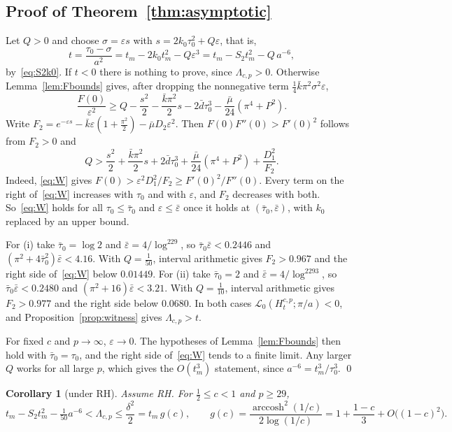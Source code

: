 \documentclass[11pt]{article}
\numberwithin{equation}{section}
\newtheorem{corollary}[theorem]{Corollary}
\theoremstyle{definition}
\theoremstyle{remark}
\DeclareMathOperator{\arccosh}{arccosh}
\newcommand{\Lag}{\mathscr L_0}
\begin{document}
\subsection{Proof of Theorem~\ref{thm:asymptotic}}
Let $Q>0$ and choose $\sigma=\varepsilon s$ with
$s=2k_0\tau_0^2+Q\varepsilon$, that is,
\[
t=\frac{\tau_0-\sigma}{a^2}=t_m-2k_0t_m^2-Q\varepsilon^3
=t_m-S_2t_m^2-Q\,a^{-6},
\]
by~\eqref{eq:S2k0}. If $t<0$ there is nothing to prove, since
$\Lambda_{c,p}>0$. Otherwise Lemma~\ref{lem:Fbounds} gives, after dropping
the nonnegative term $\tfrac14\bar k\pi^2\sigma^2\varepsilon$,
\[
\frac{F(0)}{\varepsilon^2}\ge Q-\frac{s^2}2-\frac{\bar k\pi^2}2s
-2\bar d\tau_0^3-\frac{\bar\mu}{24}(\pi^4+P^2) .
\]
Write $F_2=e^{-\varepsilon s}-\bar k\varepsilon(1+\tfrac{\pi^2}2)
-\bar\mu D_2\varepsilon^2$. Then $F(0)F''(0)>F'(0)^2$ follows from $F_2>0$
and
\begin{equation}\label{eq:W}
Q>\frac{s^2}2+\frac{\bar k\pi^2}2s+2\bar d\tau_0^3
+\frac{\bar\mu}{24}(\pi^4+P^2)+\frac{D_1^2}{F_2}.
\end{equation}
Indeed, \eqref{eq:W} gives $F(0)>\varepsilon^2D_1^2/F_2\ge F'(0)^2/F''(0)$.
Every term on the right of~\eqref{eq:W} increases with $\tau_0$ and with
$\varepsilon$, and $F_2$ decreases with both. So~\eqref{eq:W} holds for all
$\tau_0\le\bar\tau_0$ and $\varepsilon\le\bar\varepsilon$ once it holds at
$(\bar\tau_0,\bar\varepsilon)$, with $k_0$ replaced by an upper bound.

For (i) take $\bar\tau_0=\log2$ and $\bar\varepsilon=4/\log^229$, so
$\bar\tau_0\bar\varepsilon<0.2446$ and $(\pi^2+4\bar\tau_0^2)\bar\varepsilon
<4.16$. With $Q=\tfrac1{50}$, interval arithmetic gives $F_2>0.967$ and the
right side of~\eqref{eq:W} below $0.01449$.
For (ii) take $\bar\tau_0=2$ and $\bar\varepsilon=4/\log^2293$, so
$\bar\tau_0\bar\varepsilon<0.2480$ and $(\pi^2+16)\bar\varepsilon<3.21$.
With $Q=\tfrac1{10}$, interval arithmetic gives $F_2>0.977$ and the right
side below $0.0680$. In both cases $\Lag(H^{c,p}_t;\pi/a)<0$, and
Proposition~\ref{prop:witness} gives $\Lambda_{c,p}>t$.

For fixed $c$ and $p\to\infty$, $\varepsilon\to0$. The hypotheses of
Lemma~\ref{lem:Fbounds} then hold with $\bar\tau_0=\tau_0$, and the right
side of~\eqref{eq:W} tends to a finite limit. Any larger $Q$ works for all
large $p$, which gives the $O(t_m^3)$ statement, since
$a^{-6}=t_m^3/\tau_0^3$. \qed

\begin{corollary}[under RH]\label{cor:sandwich}
Assume RH. For $\tfrac12\le c<1$ and $p\ge29$,
\[
t_m-S_2t_m^2-\tfrac1{50}a^{-6}<\Lambda_{c,p}\le\frac{\delta^2}2
=t_m\,g(c),\qquad g(c)=\frac{\arccosh^2(1/c)}{2\log(1/c)}
=1+\frac{1-c}3+O\bigl((1-c)^2\bigr).
\]
\end{corollary}
\end{document}
